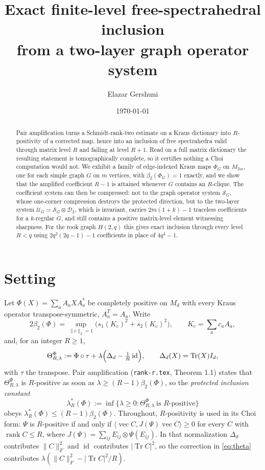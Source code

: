 \documentclass[11pt,reqno]{amsart}
\title{Exact finite-level free-spectrahedral inclusion\\
from a two-layer graph operator system}
\author{Elazar Gershuni}
\date{\today}
\theoremstyle{plain}
\theoremstyle{remark}
\DeclareMathOperator{\Tr}{Tr}
\DeclareMathOperator{\rank}{rank}
\DeclareMathOperator{\id}{id}
\DeclareMathOperator{\vecop}{vec}
\newcommand{\cS}{\mathcal S}
\newcommand{\cU}{\mathcal U}
\newcommand{\cD}{\mathcal D}
\newcommand{\ip}[2]{\langle #1,#2\rangle}
\newcommand{\norm}[1]{\lVert #1\rVert}
\newcommand{\abs}[1]{\lvert #1\rvert}
\begin{document}
\begin{abstract}
Pair amplification turns a Schmidt-rank-two estimate on a Kraus dictionary into
$R$-positivity of a corrected map, hence into an inclusion of free spectrahedra
valid through matrix level $R$ and failing at level $R+1$.  Read on a full
matrix dictionary the resulting statement is tomographically complete, so it
certifies nothing a Choi computation would not.  We exhibit a family of
edge-indexed Kraus maps $\Phi_G$ on $M_{2m}$, one for each simple graph $G$ on
$m$ vertices, with $\beta_2(\Phi_G)=1$ exactly, and we show that the amplified
coefficient $R-1$ is attained whenever $G$ contains an $R$-clique.  The
coefficient system can then be compressed: not to the graph operator system
$\cS_G$, whose one-corner compression destroys the protected direction, but to
the two-layer system $\cU_G=\cS_G\otimes\cD_2$, which is invariant, carries
$2m(1+k)-1$ traceless coefficients for a $k$-regular $G$, and still contains a
positive matrix-level element witnessing sharpness.  For the rook graph
$H(2,q)$ this gives exact inclusion through every level $R<q$ using
$2q^2(2q-1)-1$ coefficients in place of $4q^4-1$.
\end{abstract}
\maketitle

\section{Setting}

Let $\Phi(X)=\sum_aA_aXA_a^*$ be completely positive on $M_d$ with every Kraus
operator transpose-symmetric, $A_a^T=A_a$.  Write
\[
    2\beta_2(\Phi)
    =\sup_{\norm c_2=1}\bigl(s_1(K_c)^2+s_2(K_c)^2\bigr),
    \qquad K_c=\sum_ac_aA_a,
\]
and, for an integer $R\ge1$,
\begin{equation}
\label{eq:theta}
    \Theta^\Phi_{R,\lambda}
    :=\Phi\circ\tau+\lambda\Bigl(\Delta_d-\tfrac1R\id\Bigr),
    \qquad
    \Delta_d(X)=\Tr(X)I_d,
\end{equation}
with $\tau$ the transpose.  Pair amplification (\texttt{rank-r.tex},
Theorem 1.1) states that $\Theta^\Phi_{R,\lambda}$ is $R$-positive as soon as
$\lambda\ge(R-1)\beta_2(\Phi)$, so the \emph{protected inclusion constant}
\begin{equation}
\label{eq:lamstar}
    \lambda_R^*(\Phi)
    :=\inf\{\lambda\ge0:\Theta^\Phi_{R,\lambda}\ \text{is $R$-positive}\}
\end{equation}
obeys $\lambda_R^*(\Phi)\le(R-1)\beta_2(\Phi)$.  Throughout, $R$-positivity is
used in its Choi form: $\Psi$ is $R$-positive if and only if
$\ip{\vecop C}{J(\Psi)\vecop C}\ge0$ for every $C$ with $\rank C\le R$, where
$J(\Psi)=\sum_{ij}E_{ij}\otimes\Psi(E_{ij})$.  In that normalization
$\Delta_d$ contributes $\norm C_F^2$ and $\id$ contributes $\abs{\Tr C}^2$, so
the correction in \cref{eq:theta} contributes
$\lambda(\norm C_F^2-\abs{\Tr C}^2/R)$.
\end{document}

